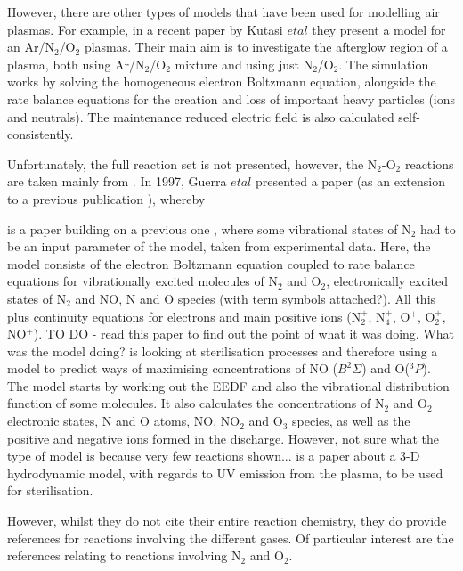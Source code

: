 \documentclass[11pt, oneside]{article}   	%
\begin{document}
However, there are other types of models that have been used for modelling air plasmas.
For example, in a recent paper by Kutasi $et al$ \cite{Kutasi2016tuning} they present a model for an Ar/N$_2$/O$_2$ plasmas.
Their main aim is to investigate the afterglow region of a plasma, both using Ar/N$_2$/O$_2$ mixture and using just N$_2$/O$_2$.
The simulation works by solving the homogeneous electron Boltzmann equation, alongside the rate balance equations for the creation and loss of important heavy particles (ions and neutrals). 
The maintenance reduced electric field is also calculated self-consistently.

Unfortunately, the full reaction set is not presented, however, the N$_2$-O$_2$ reactions are taken mainly from \cite{Guerra1997self, Pintassilgo2005modelling, Kutasi2008modelling}.
In 1997, Guerra $et al$ \cite{Guerra1997self} presented a paper (as an extension to a previous publication \cite{Guerra1995non}), whereby 


is a paper building on a previous one \cite{Guerra1995non}, where some vibrational states of N$_2$ had to be an input parameter of the model, taken from experimental data. Here, the model consists of the electron Boltzmann equation coupled to rate balance equations for vibrationally excited molecules of N$_2$ and O$_2$, electronically excited states of N$_2$ and NO, N and O species (with term symbols attached?). All this plus continuity equations for electrons and main positive ions (N$_2^+$, N$_4^+$, O$^+$, O$_2^+$, NO$^+$). TO DO - read this paper to find out the point of what it was doing. What was the model doing? 
\cite{Pintassilgo2005modelling} is looking at sterilisation processes and therefore using a model to predict ways of maximising concentrations of NO ($B ^2\Sigma$) and O($^3P$). 
The model starts by working out the EEDF and also the vibrational distribution function of some molecules. 
It also calculates the concentrations of N$_2$ and O$_2$ electronic states, N and O atoms, NO, NO$_2$ and O$_3$ species, as well as the positive and negative ions formed in the discharge. However, not sure what the type of model is because very few reactions shown...
\cite{Kutasi2008modelling} is a paper about a 3-D hydrodynamic model, with regards to UV emission from the plasma, to be used for sterilisation.

However, whilst they do not cite their entire reaction chemistry, they do provide references for reactions involving the different gases. Of particular interest are the references relating to reactions involving N$_2$ and O$_2$.
\end{document}
